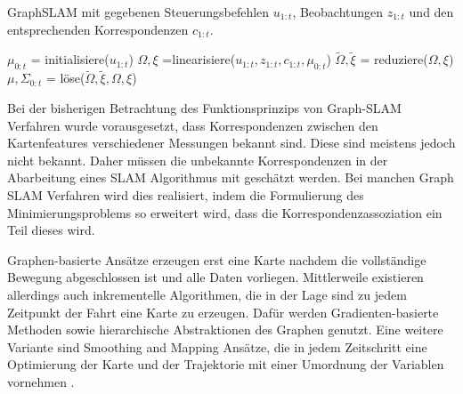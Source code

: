\begin{algorithm}
	\caption{GraphSLAM mit gegebenen Steuerungsbefehlen $ u_{1:t} $, Beobachtungen $ z_{1:t} $ und den entsprechenden Korrespondenzen $ c_{1:t} $.}
	\label{GraphSLAM}
	\begin{algorithmic}[1]
			\State $ \mu_{0:t} $ =  initialisiere($ u_{1:t}  $)
			\Repeat
				\State $ \Omega, \xi $ =linearisiere($ u_{1:t},z_{1:t},c_{1:t},\mu_{0:t} $)
				\State $ \tilde{\Omega}, \tilde{\xi} $ = reduziere($ \Omega, \xi $)
				\State $ \mu, \Sigma_{0:t} $ = löse($ \tilde{\Omega}, \tilde{\xi}, \Omega, \xi $)
			\State \Return{$ \mu $}
		\EndFunction
	\end{algorithmic}
\end{algorithm}


Bei der bisherigen Betrachtung des Funktionsprinzips von Graph-SLAM Verfahren wurde vorausgesetzt, dass Korrespondenzen zwischen den  Kartenfeatures verschiedener Messungen bekannt sind. Diese sind meistens jedoch nicht bekannt. Daher müssen die unbekannte Korrespondenzen in der Abarbeitung eines SLAM Algorithmus mit geschätzt werden. Bei manchen Graph SLAM Verfahren wird dies realisiert, indem die Formulierung des Minimierungsproblems so erweitert wird, dass die Korrespondenzassoziation ein Teil dieses wird.

Graphen-basierte Ansätze erzeugen erst eine Karte nachdem die vollständige Bewegung abgeschlossen ist und alle Daten vorliegen. Mittlerweile existieren allerdings auch inkrementelle Algorithmen, die in der Lage sind zu jedem Zeitpunkt der Fahrt eine Karte zu erzeugen. Dafür werden Gradienten-basierte Methoden \cite{Olson2007} sowie hierarchische Abstraktionen des Graphen \cite{Grisetti2010} genutzt. Eine weitere Variante sind Smoothing and Mapping Ansätze, die in jedem Zeitschritt eine Optimierung der Karte und der Trajektorie mit einer Umordnung der Variablen vornehmen \cite{Stachniss2016}.


